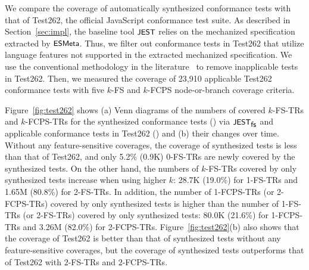 
We compare the coverage of automatically synthesized conformance tests with that
of Test262, the official JavaScript conformance test suite.
As described in Section~\ref{sec:impl}, the baseline tool $\textsf{\small JEST}$ relies on the
mechanized specification extracted by $\textsf{\small ESMeta}$.
Thus, we filter out conformance tests in Test262 that utilize language
features not supported in the extracted mechanized specification.
We use the conventional methodology in the literature~\cite{kjs, jiset, javert}
to remove inapplicable tests in Test262.
Then, we measured the coverage of 23,910 applicable Test262 conformance tests
with five $k$-FS and $k$-FCPS node-or-branch coverage criteria.


Figure~\ref{fig:test262} shows
(a) Venn diagrams of
the numbers of covered $k$-FS-TRs and 
$k$-FCPS-TRs for the synthesized conformance tests () via
$\textsf{\small JEST}_{\textsf{\small fs}}$ and applicable conformance tests in Test262 () and
(b) their changes over time.
Without any feature-sensitive coverages, the coverage of synthesized tests is
less than that of Test262, and only 5.2\% (0.9K) 0-FS-TRs are newly covered by
the synthesized tests.
%
On the other hand, the numbers of $k$-FS-TRs covered by only synthesized tests
increase when using higher $k$: 28.7K (19.0\%) for 1-FS-TRs and 1.65M (80.8\%)
for 2-FS-TRs.
%
In addition, the number of 1-FCPS-TRs (or 2-FCPS-TRs) covered by only
synthesized tests is higher than the number of 1-FS-TRs (or 2-FS-TRs)
covered by only synthesized tests:
80.0K (21.6\%) for 1-FCPS-TRs and 3.26M (82.0\%) for 2-FCPS-TRs.
Figure~\ref{fig:test262}(b) also shows that the coverage of Test262 is
better than that of synthesized tests without any feature-sensitive
coverages, but the coverage of synthesized tests outperforms that of
Test262 with $2$-FS-TRs and $2$-FCPS-TRs.
